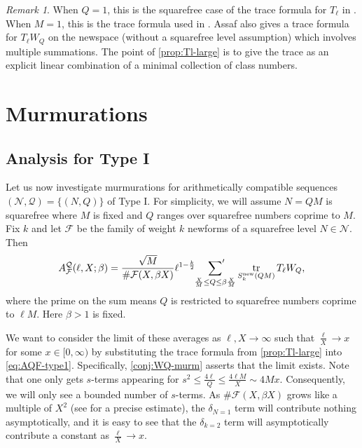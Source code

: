 \documentclass[11pt]{amsart}
\newcommand{\new}{\mathrm{new}}
\DeclareMathOperator{\tr}{tr}
\numberwithin{lem}{section}
\theoremstyle{remark}
\newtheorem{rem}[lem]{Remark}
\theoremstyle{definition}
\numberwithin{equation}{section}
\begin{document}
\begin{rem} When $Q = 1$, this is the squarefree case of the trace formula for $T_\ell$ in \cite{murty-sinha}.  When $M = 1$, this is the trace formula used in \cite{zubrilina}.  Assaf \cite{assaf} also gives a trace formula for $T_\ell W_Q$ on the newspace (without a squarefree level assumption) which involves multiple summations.  The point of \cref{prop:Tl-large} is to give the trace as an explicit linear combination of a minimal collection of class numbers.
\end{rem}


\section{Murmurations} \label{sec:murm}

\subsection{Analysis for Type I} \label{sec:murmI}

Let us now investigate murmurations for arithmetically compatible sequences $(\mathcal N, \mathcal Q) = \{ (N, Q) \}$ of Type I. For simplicity, we will assume $N = QM$ is squarefree where $M$ is fixed and $Q$ ranges over squarefree numbers coprime to $M$.  Fix $k$ and let $\mathcal F$ be the family of weight $k$ newforms of a squarefree level $N \in \mathcal N$.
Then
\begin{equation} \label{eq:AQF-type1}
 A^{\mathcal Q}_{\mathcal F}(\ell,X; \beta) = \frac {\sqrt M}{\#\mathcal F(X,\beta X)}  \ell^{1 - \frac k2} \sideset{}{'}\sum_{\frac{X}M \le Q \le \beta \frac XM}   \tr_{S^\new_k(QM)} T_\ell W_Q,
 \end{equation}
where the prime on the sum means $Q$ is restricted to squarefree numbers coprime to $\ell M$.  Here $\beta > 1$ is fixed.

We want to consider the limit of these averages as $\ell, X \to \infty$ such that $\frac \ell X \to x$ for some $x \in [0,\infty)$ by substituting the trace formula from \cref{prop:Tl-large} into \eqref{eq:AQF-type1}.  Specifically, \cref{conj:WQ-murm} asserts that the limit exists.  Note that one only gets $s$-terms appearing for $s^2 \le \frac{4\ell}Q \le \frac{4 \ell M}X \sim 4M x$.  Consequently, we will only see a bounded number of $s$-terms.  
As $\#\mathcal F(X,\beta X)$ grows like a multiple of $X^2$ (see \cite[Section 3.4]{zubrilina} for a precise estimate), the $\delta_{N=1}$ term will contribute nothing asymptotically, and it is easy to see that the $\delta_{k=2}$ term will asymptotically contribute a constant as $\frac \ell X \to x$.  
\end{document}

